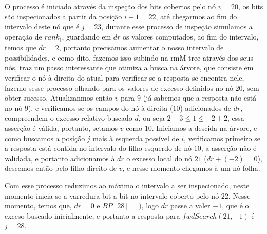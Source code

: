 \begin{example}
        O processo é iniciado através da inspeção dos bits cobertos pelo nó $v=20$, os bits são inspecionados a partir da posição $i+1=22$, 
        até chegarmos ao
        fim do intervalo deste nó que é $j=23$, durante esse processo de inspeção simulamos a operação de $rank_($, 
        guardando em $dr$ os valores computados, ao fim do intervalo,
        temos que $dr=2$, 
        portanto precisamos aumentar o nosso intervalo de possibilidades, e como dito, 
        fazemos isso subindo na rmM-tree através dos seus nós, \citeauthor{book-compact-data-structures} traz um passo interessante que otimiza a busca na árvore, que consiste em 
        verificar o nó à direita do atual para verificar se a resposta se encontra nele, fazemo sesse processo olhando para os valores de excesso definidos no nó $20$,
         sem obter sucesso. Atualizanmos  então $v$ para $9$ (já sabemos que a resposta não está no nó $9$), 
         e verificamos se os campos do nó à direita ($10$) adicionados de $dr$, compreendem o excesso relativo buscado $d$, 
         ou seja $2 -3 \leq 1 \leq -2 +2$, essa asserção é válida, portanto, setamos $v$ como $10$. Iniciamos a descida na
         árvore, e como buscamos a posição $j$ mais à esquerda possível de $i$, verificamos primeiro se a resposta está contida no intervalo do filho esquerdo
        de nó $10$, a asserção não é validada, e portanto adicionamos à $dr$ o excesso local do nó $21$ ($dr + (-2)= 0$), 
        descemos então pelo filho direito de $v$, e nesse momento chegamos à
         um nó folha.
         
         Com esse processo reduzimos ao máximo o intervalo a ser inspecionado, neste momento inicia-se a varredura bit-a-bit no intervalo coberto pelo nó $22$. Nesse momento,
         temos que, $dr=0$ e $BP[28] = )$, logo $dr$ passe a valer $-1$, que é o exceso buscado inicialmente, e portanto a resposta para $fwdSearch(21,-1)$ é $j=28$.
    \end{example}
    
